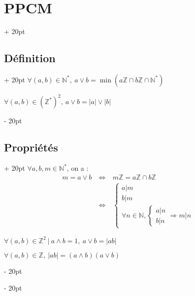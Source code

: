\documentclass[a4paper, 12pt, twoside]{article}
\newcommand{\N}{\mathbb{N}} %
\newcommand{\Z}{\mathbb{Z}} %
\newcommand{\ssi}{\ \Leftrightarrow \ }
\newcommand{\abs}[1]{\left\lvert #1 \right\rvert} %
\newcommand{\eqsys}[2]{\begin{cases} #1 \\ #2 \end{cases}}
\newcommand{\ind}[1][20pt]{\advance\leftskip + #1}
\newcommand{\deind}[1][20pt]{\advance\leftskip - #1}
\newenvironment{indt}[2][20pt]{#2 \par \ind[#1]}{\par \deind} %
\begin{document}
    \begin{indt}{\section{PPCM}}
        
        \begin{indt}{\subsection{Définition}}
            $\forall (a, b) \in \N^*,\ a \vee b = \min(a\Z \cap b\Z \cap \N^*)$
            
            $\forall (a, b) \in (\Z^*)^2,\ a \vee b = \abs a \vee \abs b$
        \end{indt}
        
        \vspace{6pt}
        
        \begin{indt}{\subsection{Propriétés}}
            $\forall a, b, m \in \N^*$, on a :
                \[
                    \begin{array}{rcl}
                        m = a \vee b
                        &\ssi& m\Z = a\Z \cap b\Z
                        \\
                        &\ssi&
                        \begin{cases}
                            a|m
                            \\
                            b|m
                            \\
                            \forall n \in \N, \eqsys{a|n}{b|n} \Rightarrow m|n
                        \end{cases}
                    \end{array}
                \]
            
            \vspace{6pt}
            
            $\forall (a, b) \in \Z^2\ |\ a \wedge b = 1,\ a \vee b = \abs{ab}$
            
            \vspace{6pt}
            
            $\forall (a, b) \in \Z,\ \abs{ab} = (a \wedge b)(a \vee b)$
        \end{indt}
        
    \end{indt}
\end{document}
